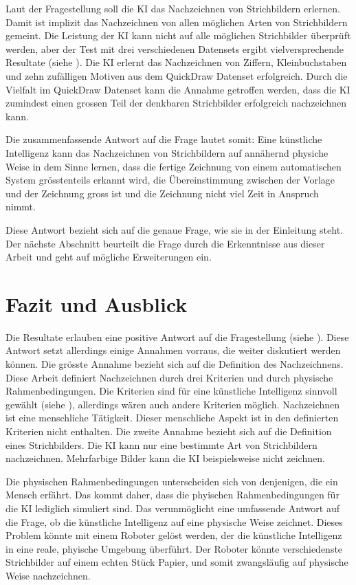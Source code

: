 Laut der Fragestellung soll die KI das Nachzeichnen von Strichbildern erlernen.
Damit ist implizit das Nachzeichnen von allen möglichen Arten von Strichbildern
gemeint. Die Leistung der KI kann nicht auf alle möglichen Strichbilder
überprüft werden, aber der Test mit drei verschiedenen Datensets ergibt
vielversprechende Resultate (siehe ). Die KI erlernt das
Nachzeichnen von Ziffern, Kleinbuchstaben und zehn zufälligen Motiven aus dem
QuickDraw Datenset erfolgreich. Durch die Vielfalt im QuickDraw Datenset kann
die Annahme getroffen werden, dass die KI zumindest einen grossen Teil der
denkbaren Strichbilder erfolgreich nachzeichnen kann. 

Die zusammenfassende Antwort auf die Frage lautet somit: Eine künstliche
Intelligenz kann das Nachzeichnen von Strichbildern auf annähernd physiche Weise
in dem Sinne lernen, dass die fertige Zeichnung von einem automatischen System
grösstenteils erkannt wird, die Übereinstimmung zwischen der Vorlage und der
Zeichnung gross ist und die Zeichnung nicht viel Zeit in Anspruch nimmt.

Diese Antwort bezieht sich auf die genaue Frage, wie sie in der Einleitung steht.
Der nächste Abschnitt beurteilt die Frage durch die Erkenntnisse aus dieser
Arbeit und geht auf mögliche Erweiterungen ein.


\section{Fazit und Ausblick}\label{chap:d_faz-aus} Die Resultate erlauben eine
positive Antwort auf die Fragestellung (siehe ).
Diese Antwort setzt allerdings einige Annahmen vorraus, die weiter diskutiert
werden können. Die grösste Annahme bezieht sich auf die Definition des
Nachzeichnens. Diese Arbeit definiert Nachzeichnen durch drei Kriterien und
durch physische Rahmenbedingungen. Die Kriterien sind für eine künstliche
Intelligenz sinnvoll gewählt (siehe ),
allerdings wären auch andere Kriterien möglich. Nachzeichnen ist eine
menschliche Tätigkeit. Dieser menschliche Aspekt ist in den definierten
Kriterien nicht enthalten. Die zweite Annahme bezieht sich auf die Definition
eines Strichbilders. Die KI kann nur eine bestimmte Art von Strichbildern
nachzeichnen. Mehrfarbige Bilder kann die KI beispielsweise nicht zeichnen.

Die physischen Rahmenbedingungen unterscheiden sich von denjenigen, die ein
Mensch erfährt. Das kommt daher, dass die phyischen Rahmenbedingungen für die KI
lediglich simuliert sind. Das verunmöglicht eine umfassende Antwort auf die
Frage, ob die künstliche Intelligenz auf eine physische Weise zeichnet. Dieses
Problem könnte mit einem Roboter gelöst werden, der die künstliche Intelligenz
in eine reale, phyische Umgebung überführt. Der Roboter könnte verschiedenste
Strichbilder auf einem echten Stück Papier, und somit zwangsläufig auf physische
Weise nachzeichnen.

